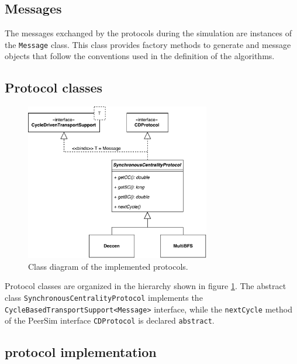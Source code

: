 \subsection{Messages}
The messages exchanged by the protocols during the simulation are instances of the \texttt{Message} class. This class provides factory methods to generate \mdisc{} and \mrep{} message objects that follow the conventions used in the definition of the algorithms. 

\subsection{Protocol classes}

\begin{figure}
\centering
\includegraphics[width=0.72\textwidth]{diagram.pdf}
\caption{Class diagram of the implemented protocols.}
\label{class:protocol:hierarchy}
\end{figure}

Protocol classes are organized in the hierarchy shown in figure \ref{class:protocol:hierarchy}. The abstract class \texttt{SynchronousCentralityProtocol} implements the \texttt{Cycle\allowbreak Based\-Transport\-Support<Message>}  interface, while the \texttt{nextCycle} method of the PeerSim interface \texttt{CDProtocol} is declared \texttt{abstract}.

\subsection{\deccen{} protocol implementation}

